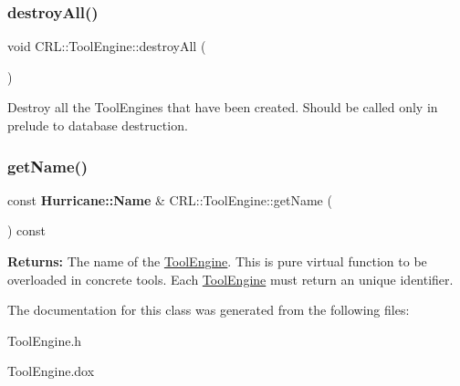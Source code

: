 \subsubsection{\texorpdfstring{destroy\+All()}{destroyAll()}}
{\footnotesize\ttfamily void C\+R\+L\+::\+Tool\+Engine\+::destroy\+All (\begin{DoxyParamCaption}{ }\end{DoxyParamCaption})\hspace{0.3cm}{\ttfamily [static]}}

Destroy all the Tool\+Engines that have been created. Should be called only in prelude to database destruction. \mbox{\label{classCRL_1_1ToolEngine_a98c8fd84e7ea36d25287c08b75e9d5e7}} 
\subsubsection{\texorpdfstring{get\+Name()}{getName()}}
{\footnotesize\ttfamily const \textbf{ Hurricane\+::\+Name} \& C\+R\+L\+::\+Tool\+Engine\+::get\+Name (\begin{DoxyParamCaption}{ }\end{DoxyParamCaption}) const\hspace{0.3cm}{\ttfamily [pure virtual]}}

{\bfseries Returns\+:} The name of the \hyperlink{classCRL_1_1ToolEngine}{Tool\+Engine}. This is pure virtual function to be overloaded in concrete tools. Each \hyperlink{classCRL_1_1ToolEngine}{Tool\+Engine} must return an unique identifier. 

The documentation for this class was generated from the following files\+:\begin{DoxyCompactItemize}
\item 
Tool\+Engine.\+h\item 
Tool\+Engine.\+dox\end{DoxyCompactItemize}
